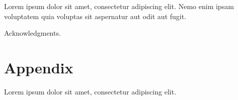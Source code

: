 \documentclass{article}
\begin{document}
Lorem ipsum dolor sit amet, consectetur adipiscing elit. Nemo enim ipsam voluptatem quia voluptas sit aspernatur aut odit aut fugit.


\begin{ack}
Acknowledgments.
\end{ack}





\appendix

\section{Appendix}
\label{sec:appendix}

Lorem ipsum dolor sit amet, consectetur adipiscing elit.
\end{document}
